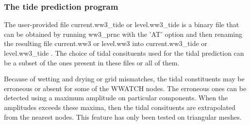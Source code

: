 \vsssub
\subsubsection{The tide prediction program} \label{sub:ww3prtide}
\vsssub



\vspace{\baselineskip} 
\vspace{\baselineskip} 
\noindent 
The user-provided file current.ww3\_tide or level.ww3\_tide is a binary file
that can be obtained by running ww3\_prnc with the 'AT' option and then
renaming the resulting file current.ww3 or level.ww3 into current.ww3\_tide or
level.ww3\_tide . The choice of tidal consituents used for the tidal
prediction can be a subset of the ones present in these files or all of them.

Because of wetting and drying or grid mismatches, the tidal constituents may
be erroneous or absent for some of the WWATCH nodes. The erroneous ones can be
detected using a maximum amplitude on particular components. When the
amplitudes exceeds these maxima, then the tidal consituents are extrapolated
from the nearest nodes. This feature has only been tested on triangular
meshes.

\pb
